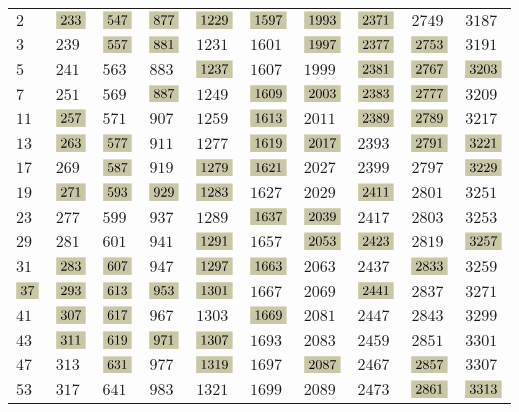 \documentclass{article}
\newcommand{\highlight}[1]{\colorbox{shadecolor}{$\displaystyle #1$}}
\begin{document}
\pagebreak

\begin{center}
{\footnotesize
\begin{tabular}{x{1cm}x{1cm}x{1cm}x{1cm}x{1cm}x{1cm}x{1cm}x{1cm}x{1cm}x{1cm}}
$2$ & $\highlight{233}$ & $\highlight{547}$ & $\highlight{877}$ & $\highlight{1229}$ & $\highlight{1597}$ & $\highlight{1993}$ & $\highlight{2371}$ & $2749$ & $3187$ \tabularnewline
$3$ & $239$ & $\highlight{557}$ & $\highlight{881}$ & $1231$ & $1601$ & $\highlight{1997}$ & $\highlight{2377}$ & $\highlight{2753}$ & $3191$ \tabularnewline
$5$ & $241$ & $563$ & $883$ & $\highlight{1237}$ & $1607$ & $1999$ & $\highlight{2381}$ & $\highlight{2767}$ & $\highlight{3203}$ \tabularnewline
$7$ & $251$ & $569$ & $\highlight{887}$ & $1249$ & $\highlight{1609}$ & $\highlight{2003}$ & $\highlight{2383}$ & $\highlight{2777}$ & $3209$ \tabularnewline
$11$ & $\highlight{257}$ & $571$ & $907$ & $1259$ & $\highlight{1613}$ & $2011$ & $\highlight{2389}$ & $\highlight{2789}$ & $3217$ \tabularnewline
$13$ & $\highlight{263}$ & $\highlight{577}$ & $911$ & $1277$ & $\highlight{1619}$ & $\highlight{2017}$ & $2393$ & $\highlight{2791}$ & $\highlight{3221}$ \tabularnewline
$17$ & $269$ & $\highlight{587}$ & $919$ & $\highlight{1279}$ & $\highlight{1621}$ & $2027$ & $2399$ & $2797$ & $\highlight{3229}$ \tabularnewline
$19$ & $\highlight{271}$ & $\highlight{593}$ & $\highlight{929}$ & $\highlight{1283}$ & $1627$ & $2029$ & $\highlight{2411}$ & $2801$ & $3251$ \tabularnewline
$23$ & $277$ & $599$ & $937$ & $1289$ & $\highlight{1637}$ & $\highlight{2039}$ & $2417$ & $2803$ & $3253$ \tabularnewline
$29$ & $281$ & $601$ & $941$ & $\highlight{1291}$ & $1657$ & $\highlight{2053}$ & $\highlight{2423}$ & $2819$ & $\highlight{3257}$ \tabularnewline
$31$ & $\highlight{283}$ & $\highlight{607}$ & $947$ & $\highlight{1297}$ & $\highlight{1663}$ & $2063$ & $2437$ & $\highlight{2833}$ & $3259$ \tabularnewline
$\highlight{37}$ & $\highlight{293}$ & $\highlight{613}$ & $\highlight{953}$ & $\highlight{1301}$ & $1667$ & $2069$ & $\highlight{2441}$ & $2837$ & $3271$ \tabularnewline
$41$ & $\highlight{307}$ & $\highlight{617}$ & $967$ & $1303$ & $\highlight{1669}$ & $2081$ & $2447$ & $2843$ & $3299$ \tabularnewline
$43$ & $\highlight{311}$ & $\highlight{619}$ & $\highlight{971}$ & $\highlight{1307}$ & $1693$ & $2083$ & $2459$ & $2851$ & $3301$ \tabularnewline
$47$ & $313$ & $\highlight{631}$ & $977$ & $\highlight{1319}$ & $1697$ & $\highlight{2087}$ & $2467$ & $\highlight{2857}$ & $3307$ \tabularnewline
$53$ & $317$ & $641$ & $983$ & $1321$ & $1699$ & $2089$ & $2473$ & $\highlight{2861}$ & $\highlight{3313}$ \tabularnewline

\end{tabular}}
\end{center}
\end{document}
